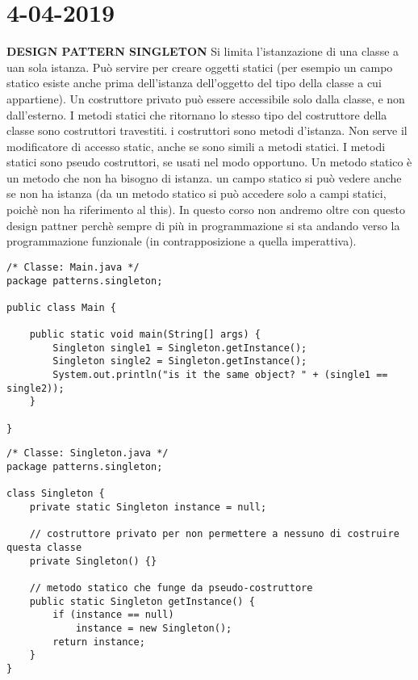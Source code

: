 

\newpage
\section{4-04-2019}
\textbf{DESIGN PATTERN SINGLETON} \newline
Si limita l'istanzazione di una classe a uan sola istanza. \newline
Può servire per creare oggetti statici (per esempio un campo statico esiste anche prima dell'istanza dell'oggetto del tipo della classe a cui appartiene). \newline
Un costruttore privato può essere accessibile solo dalla classe, e non dall'esterno. \newline
I metodi statici che ritornano lo stesso tipo del costruttore della classe sono costruttori travestiti. \newline
i costruttori sono metodi d'istanza. Non serve il modificatore di accesso static, anche se sono simili a metodi statici. \newline
I metodi statici sono pseudo costruttori, se usati nel modo opportuno. \newline
Un metodo statico è un metodo che non ha bisogno di istanza. un campo statico si può vedere anche se non ha istanza (da un metodo statico si può accedere solo a campi statici, poichè non ha riferimento al this). \newline
In questo corso non andremo oltre con questo design pattner perchè sempre di più in programmazione si sta andando verso la programmazione funzionale (in contrapposizione a quella imperattiva).


\begin{lstlisting}[basicstyle=\small,]
/* Classe: Main.java */
package patterns.singleton;

public class Main {

    public static void main(String[] args) {
        Singleton single1 = Singleton.getInstance();
        Singleton single2 = Singleton.getInstance();
        System.out.println("is it the same object? " + (single1 == single2));
    }

}

\end{lstlisting}

\begin{lstlisting}[basicstyle=\small,]
/* Classe: Singleton.java */
package patterns.singleton;

class Singleton {
    private static Singleton instance = null;

    // costruttore privato per non permettere a nessuno di costruire questa classe
    private Singleton() {}

    // metodo statico che funge da pseudo-costruttore
    public static Singleton getInstance() {
        if (instance == null)
            instance = new Singleton();
        return instance;
    }
}

\end{lstlisting}


